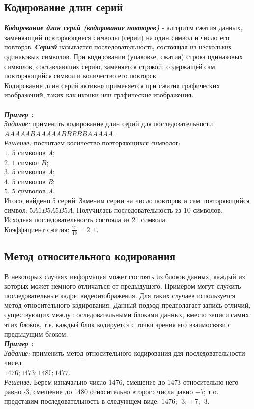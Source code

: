 \subsection{Кодирование длин серий}
\emph{\textbf{Кодирование длин серий (кодирование повторов)}} - алгоритм сжатия данных, заменяющий повторяющиеся символы (серии) на один символ и число его повторов. \emph{\textbf{Серией}} называется последовательность, состоящая из нескольких одинаковых символов. При кодировании (упаковке, сжатии) строка одинаковых символов, составляющих серию, заменяется строкой, содержащей сам повторяющийся символ и количество его повторов.
\\Кодирование длин серий активно применяется при сжатии графических изображений, таких как иконки или графические изображения.
\\
\\\emph{\textbf{Пример :}}
\\\emph{Задание:} применить кодирование длин серий для последовательности \\$AAAAABAAAAABBBBBAAAAA$.
\\\emph{Решение:} посчитаем количество повторяющихся символов:
\\$1.$ $5$ символов $A$;
\\$2.$ $1$ символ $B$;
\\$3.$ $5$ символов $A$;
\\$4.$ $5$ символов $B$;
\\$5.$ $5$ символов $A$.
\\Итого, найдено 5 серий. Заменим серии на число повторов и сам повторяющийся символ: $5A1B5A5B5A$. Получилась последовательность из 10 символов. Исходная последовательность состояла из 21 символа.
\\Коэффициент сжатия: $\frac{21}{10} = 2,1$.

\subsection{Метод относительного кодирования}
В некоторых случаях информация может состоять из блоков данных, каждый из которых может немного отличаться от предыдущего. Примером могут служить последовательные кадры видеоизображения. Для таких случаев используется метод относительного кодирования. Данный подход предполагает запись отличий, существующих между последовательными блоками данных, вместо записи самих этих блоков, т.е. каждый блок кодируется с точки зрения его взаимосвязи с предыдущим блоком. 
\\\emph{\textbf{Пример :}}
\\\emph{Задание:} применить метод относительного кодирования для последовательности чисел \\$1476; 1473; 1480; 1477$.
\\\emph{Решение:} Берем изначально число 1476, смещение до 1473 относительно него равно -3, смещение до 1480 относительно второго числа равно +7; т.о. представим последовательность в следующем виде: 1476; -3; +7; -3.

